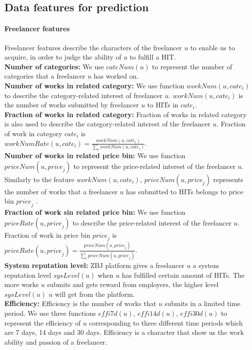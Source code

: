 \subsection{Data features for prediction}
\paragraph{Freelancer features} Freelancer features describe the characters of the freelancer $u$ to enable us to acquire, in order to judge the ability of $u$ to fulfill a HIT.  \\
\textbf{Number of categories:} We use $cateNum(u)$ to represent the number of categories that a freelancer $u$ has worked on. \\
\textbf{ Number of works in related category:}  We use function $workNum(u,{cate}_{i})$ to describe the category-related interest of freelancer $u$. $workNum(u,{cate}_{i})$ is the number of works submitted by freelancer $u$ to HITs in ${cate}_{i}$.\\ 
\textbf{ Fraction of works in related category:} Fraction of works in related category is also used to describe the category-related interest of the freelancer $u$. Fraction of work in category ${cate}_{i}$ is \\ $workNumRate(u,{cate}_{i})= \frac{workNum(u, {cate}_{i})}{\sum _{i}{workNum(u, {cate}_{i})} } $. \\ 
\textbf{ Number of works in related price bin:}  We use function $priceNum(u,{price}_{j})$ to represent the price-related interest of the freelancer $u$. Similarly to the feature $workNum(u,{cate}_{i})$, $priceNum(u,{price}_{j})$ represents the number of works that a freelancer $u$ has submitted to HITs belongs to price bin ${price}_{j}$ .\\
%
\textbf{ Fraction of work sin related price bin:} We use function $priceRate(u,{price}_{j})$ to describe the price-related interest of the freelancer $u$. Fraction of work in price bin ${price}_{j}$ is \\$priceRate(u,{price}_{j})= \frac{priceNum(u,{price}_{j})}{\sum _{i}{priceNum(u,{price}_{j})} }$.\\
\textbf{ System reputation level:} ZBJ platform gives a freelancer $u$ a system reputation level $sysLevel(u)$ when $u$ has fulfilled certain amount of HITs. The more works $u$ submits and gets reward from employers, the higher level $sysLevel(u)$ $u$ will get from the platform. \\
\textbf{ Efficiency:} Efficiency is the number of works that $u$ submits in a limited time period. We use three functions $effi7d(u)$, $effi14d(u)$, $effi30d(u)$ to represent the efficiency of $u$ corresponding to three different time periods which are 7 days, 14 days and 30 days. Efficiency is a character that show us the work ability and passion of a freelancer. \\
